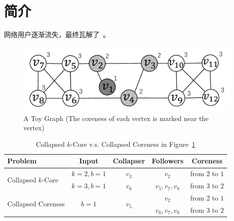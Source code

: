 \section{简介}

网络用户逐渐流失，最终瓦解了~\cite{friendster,DBLP:conf/cosn/GarciaMS13}。

\begin{figure}
    \centering
    \includegraphics[width=0.7\linewidth]{figures/toy-example}
    \caption{A Toy Graph (The coreness of each vertex is marked near the vertex)}%
    \label{fig:example}
\end{figure}

\begin{table}[t]
    \centering%
    \caption{Collapsed $k$-Core v.s. Collapsed Coreness in Figure~\ref{fig:example}}
    \label{tab:example}
    \begin{tabular}{|l|c|c|c|c|}
        \hline
        \textbf{Problem}                    & \textbf{Input}             & \textbf{Collapser}         & \textbf{Followers}      & \textbf{Coreness}   \\
        \hline
        \hline
        \multirow{2}{*}{Collapsed $k$-Core} & $k=2,b=1$              & $v_3$                  & $v_2$               & from $2$ to $1$ \\

        \cline{2-5}                         & $k=3,b=1$              & $v_6$                  & $v_{5},v_{7},v_{8}$ & from $3$ to $2$ \\
        \hline
        \multirow{2}{*}{Collapsed Coreness} & \multirow{2}{*}{$b=1$} & \multirow{2}{*}{$v_5$} & $v_2$ & from $2$ to $1$ \\
        \cline{4-5}                         &                        &                        & $v_6,v_7,v_8$       & from $3$ to $2$ \\

        \hline
    \end{tabular}
\end{table}
